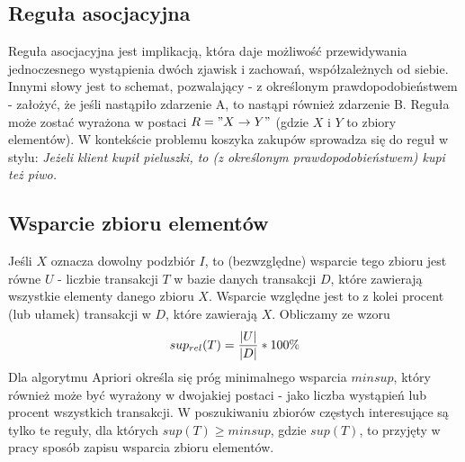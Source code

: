 \subsection{Reguła asocjacyjna}
\label{c222}
Reguła asocjacyjna jest implikacją, która daje możliwość przewidywania jednoczesnego wystąpienia dwóch zjawisk i zachowań, współzależnych od siebie. Innymi słowy jest to schemat, pozwalający - z określonym prawdopodobieństwem - założyć, że jeśli nastąpiło zdarzenie A, to nastąpi również zdarzenie B. Reguła może zostać wyrażona w postaci \(R = "X\rightarrow Y"\) (gdzie \(X\) i \(Y\) to zbiory elementów). W kontekście problemu koszyka zakupów sprowadza się do reguł w stylu: \textit{Jeżeli klient kupił pieluszki, to (z określonym prawdopodobieństwem) kupi też piwo.} 

\subsection{Wsparcie zbioru elementów}
\label{c223}
Jeśli \(X\) oznacza dowolny podzbiór \(I\), to (bezwzględne) wsparcie tego zbioru jest równe \(U\) - liczbie transakcji \(T\) w bazie danych transakcji \(D\), które zawierają wszystkie elementy danego zbioru \(X\). Wsparcie względne jest to z kolei procent (lub ułamek) transakcji w \(D\), które zawierają \(X\). Obliczamy ze wzoru \[sup_{rel}(T)=\nolinebreak\frac{|U|}{|D|}*100\%\] Dla algorytmu Apriori określa się próg minimalnego wsparcia \(minsup\), który również może być wyrażony w dwojakiej postaci - jako liczba wystąpień lub procent wszystkich transakcji. W poszukiwaniu zbiorów częstych interesujące są tylko te reguły, dla których \(sup(T) \geq minsup \), gdzie \(sup(T)\), to przyjęty w pracy sposób zapisu wsparcia zbioru elementów.

